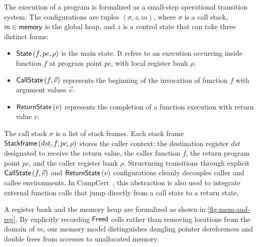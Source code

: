 \documentclass[report.tex]{subfiles}
\begin{document}
The execution of a \muRTL{} program is formalized as a small-step operational
transition system.
The configurations are tuples $(\sigma, z, m)$,
where $\sigma$ is a call stack,
$m \in \textsf{memory}$ is the global heap,
and $z$ is a control state that can take three distinct forms:
\begin{itemize}
  \item $\textsf{State}\left(f, pc, \rho\right)$ is the main state.
        It refers to an execution occurring inside function $f$
        at program point $pc$,
        with local register bank $\rho$.

  \item $\textsf{CallState}\left(f, \vec{v}\right)$
        represents the beginning of the invocation of function $f$
        with argument values $\vec{v}$.

  \item $\textsf{ReturnState}\left(v\right)$ represents the completion of a function execution
        with return value $v$.
\end{itemize}

The call stack $\sigma$ is a list of stack frames.
Each stack frame $\textsf{Stackframe}\left(dst, f, pc, \rho\right)$ stores the caller
context:
the destination register $dst$ designated to receive the return value,
the caller function $f$,
the return program point $pc$,
and the caller register bank $\rho$.
Structuring transitions through explicit $\textsf{CallState}\left(f, \vec{v}\right)$ and
$\textsf{ReturnState}\left(v\right)$ configurations cleanly decouples caller and callee
environments.
In CompCert~\parencite{leroy-09-compcert},
this abstraction is also used to integrate external function calls that jump
directly from a call state to a return state.

A register bank and the memory heap are formalized as shown in
\cref{fig:mem-and-reg}.
By explicitly recording $\textsf{Freed}$ cells rather than removing locations
from the domain of $m$,
our memory model distinguishes dangling pointer dereferences and double frees
from accesses to unallocated memory.
\end{document}

